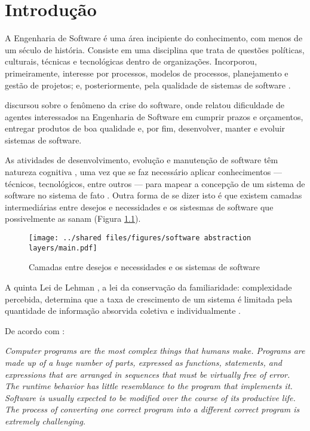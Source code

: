 
%

\chapter{Introdução}
\label{chap:Introdução}

A Engenharia de Software é uma área incipiente do conhecimento, com menos
de um século de história. Consiste em uma disciplina que trata de questões
políticas, culturais, técnicas e tecnológicas dentro de organizações.
Incorporou, primeiramente, interesse por processos, modelos de processos,
planejamento e gestão de projetos; e, posteriormente, pela qualidade de
sistemas de software \cite{Wazlawick2013:Engenharia}.

 discursou sobre o fenômeno da crise
do software, onde relatou dificuldade de agentes interessados na Engenharia de
Software em cumprir prazos e orçamentos, entregar produtos de boa qualidade e,
por fim, desenvolver, manter e evoluir sistemas de software.

As atividades de desenvolvimento, evolução e manutenção de software têm natureza
cognitiva \cite{Letovsky1987:Cognitive}, uma vez que se faz necessário aplicar
conhecimentos --- técnicos, tecnológicos, entre outros --- para mapear a
concepção de um sistema de software no sistema de fato
\cite{Brooks1983:TheoryComprehension}. Outra forma de se dizer isto é que 
existem camadas intermediárias entre desejos e necessidades e os sistesmas
de software que possivelmente as sanam (Figura \ref{fig:CamadasAbstraçãoSoftware}).

\begin{figure}[!htb]
    \centering
    \caption{Camadas entre desejos e necessidades e os sistemas de software}
    \texttt{[image: ../shared files/figures/software abstraction layers/main.pdf]}
    \label{fig:CamadasAbstraçãoSoftware}
\end{figure}

A quinta Lei de Lehman \cite{Lehman1980:Laws}, a lei da conservação da
familiaridade: complexidade percebida, determina que a taxa de crescimento de
um sistema é limitada pela quantidade de informação absorvida coletiva e
individualmente \cite{Wazlawick2013:Engenharia}.

De acordo com :

\begin{citacao}
\textit{Computer programs are the most complex things that humans make. Programs
are made up of a huge number of parts, expressed as functions, statements, and
expressions that are arranged in sequences that must be virtually free of error.
The runtime behavior has little resemblance to the program that implements it.
Software is usually expected to be modified over the course of its productive
life. The process of converting one correct program into a different correct
program is extremely challenging.}
\end{citacao}

